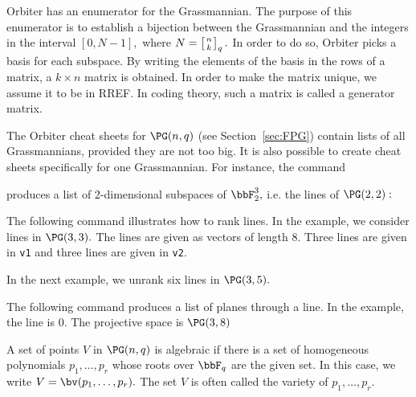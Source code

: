 \bigskip

Orbiter has an enumerator for the Grassmannian. 
The purpose of this enumerator is to establish a bijection 
between the Grassmannian and the integers in the interval 
$
[0,N-1],
$ 
where $N = \left[
n \atop k
\right]_q.$
In order to do so, Orbiter picks a basis for each subspace. 
By writing the elements of the basis in the rows of a matrix, a $k\times n$ matrix is obtained. 
In order to make the matrix unique, we assume it to be in RREF. 
In coding theory, such a matrix is called a generator matrix.

\bigskip


The Orbiter cheat sheets for $\PG(n,q)$ (see Section~\ref{sec:FPG}) 
contain lists of all Grassmannians, provided they are not too big.
It is also possible to create cheat sheets specifically for one Grassmannian.
For instance, the command
{\tt

}
produces a list of 2-dimensional 
subspaces of $\bbF_2^3,$ i.e. the lines of $\PG(2,2):$
\begin{mdframed}[style=MyFrame]

\end{mdframed}

\bigskip

The following command illustrates how to rank lines.
In the example, we consider lines in $\PG(3,3).$
The lines are given as vectors of length $8.$ Three lines are given in \verb'v1' 
and three lines are given in \verb'v2'.
{\tt

}


\bigskip

In the next example, we unrank six lines in $\PG(3,5).$
{\tt

}

\bigskip


The following command produces a list of planes through a line. 
In the example, the line is $0$. The projective space is $\PG(3,8)$
{\tt

}



\bigskip




A set of points $V$ in $\PG(n,q)$ is algebraic if there is a set 
of homogeneous polynomials $p_1,\ldots,p_r$
whose roots over $\bbF_q$ are the given set. 
In this case, we write $V = \bv(p_1,\ldots,p_r).$ 
The set $V$ is often called the variety of $p_1,\ldots,p_r.$

\bigskip

